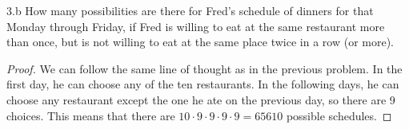 \begin{exercise}{3.b}
How many possibilities are there for Fred’s schedule of dinners for that Monday
through Friday, if Fred is willing to eat at the same restaurant more than once, but is
not willing to eat at the same place twice in a row (or more).
\end{exercise}

\begin{proof}
    We can follow the same line of thought as in the previous problem. In the first day, he can choose any of the ten restaurants. In the following days, he can choose any restaurant except the one he ate on the previous day, so there are 9 choices. This means that there are $10 \cdot 9 \cdot 9 \cdot 9 \cdot 9 = 65610$ possible schedules.
\end{proof}


